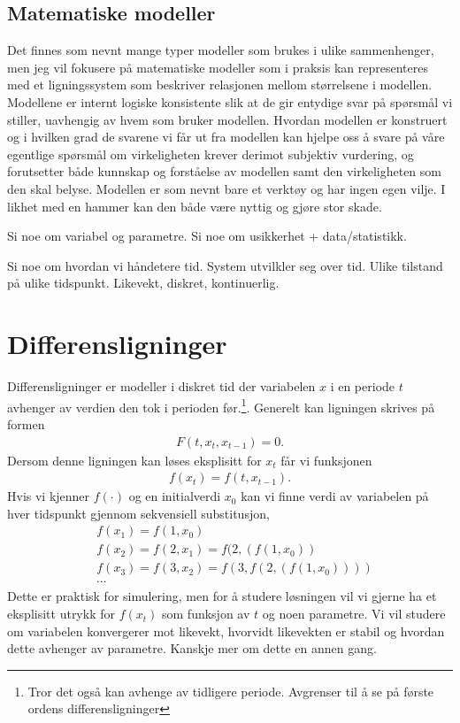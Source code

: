 \subsection{Matematiske modeller}
Det finnes som nevnt mange typer modeller som brukes i ulike sammenhenger, men jeg vil fokusere på matematiske modeller som i praksis kan representeres med et ligningssystem som beskriver relasjonen mellom størrelsene i modellen. Modellene er internt logiske konsistente slik at de gir entydige svar på spørsmål vi stiller, uavhengig av hvem som bruker modellen. Hvordan modellen er konstruert og i hvilken grad de svarene vi får ut fra modellen kan hjelpe oss å svare på våre egentlige spørsmål om virkeligheten krever derimot subjektiv vurdering, og forutsetter både kunnskap og forståelse av modellen samt den virkeligheten som den skal belyse. Modellen er som nevnt bare et verktøy og har ingen egen vilje. I likhet med en hammer kan den både være nyttig og gjøre stor skade. 

Si noe om variabel og parametre. Si noe om usikkerhet + data/statistikk.

Si noe om hvordan vi håndetere tid. System utvilkler seg over tid. Ulike tilstand på ulike tidspunkt. Likevekt, diskret, kontinuerlig. 
\section{Differensligninger}
Differensligninger er modeller i diskret tid der variabelen $x$ i en periode $t$ avhenger av verdien den tok i perioden før.\footnote{Tror det også kan avhenge av tidligere periode. Avgrenser til å se på første ordens differensligninger}. Generelt kan ligningen skrives på formen
\begin{align}
F(t,x_t, x_{t-1})=0.
\end{align}
Dersom denne ligningen kan løses eksplisitt for $x_t$ får vi funksjonen
\begin{align}
f(x_t)=f(t,x_{t-1}).
\end{align}
Hvis vi kjenner $f(\cdot)$ og en initialverdi $x_0$ kan vi finne verdi av variabelen på hver tidspunkt gjennom sekvensiell substitusjon,
\begin{align}
&f(x_1) = f(1,x_0) \\
&f(x_2) = f(2, x_1) = f(2,(f(1,x_0)) \\
&f(x_3) = f(3,x_2) = f(3,f(2,(f(1,x_0)))) \\
&\cdots
\end{align}
Dette er praktisk for simulering, men for å studere løsningen vil vi gjerne ha et eksplisitt utrykk for $f(x_t)$ som funksjon av $t$ og noen parametre. Vi vil studere om variabelen konvergerer mot likevekt, hvorvidt likevekten er stabil og hvordan dette avhenger av parametre. Kanskje mer om dette en annen gang.
